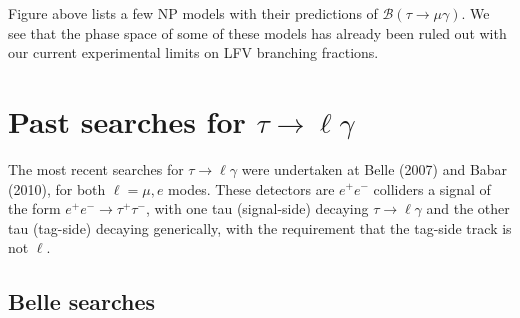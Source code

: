\documentclass[12pt]{thesis}  %
\newcommand{\br}{\mathcal{B}}
\newcommand{\tmg}{\tau\to\mu\gamma}
\newcommand{\tlg}{\tau\to\ell\gamma}
\begin{document}
Figure above lists a few NP models with their predictions of $\br(\tmg)$. We see that the phase space of some of these models has already been ruled out with our current experimental limits on LFV branching fractions.


\section{Past searches for $\tlg$}

The most recent searches for $\tlg$ were undertaken at Belle (2007) and Babar (2010), for both $\ell=\mu,e$ modes. These detectors are $e^+ e^-$ colliders a signal of the form $e^+ e^-\to \tau^+ \tau^-$, with one tau (signal-side) decaying $\tau\to \ell \gamma$ and the other tau (tag-side) decaying generically, with the requirement that the tag-side track is not $\ell$.


\subsection{Belle searches}
\end{document}
